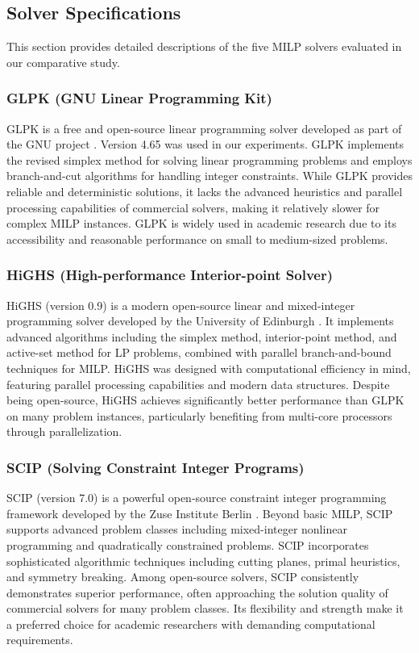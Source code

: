 \documentclass[11pt,a4paper]{article}
\begin{document}
\subsection{Solver Specifications}
This section provides detailed descriptions of the five MILP solvers evaluated in our comparative study.

\subsubsection{GLPK (GNU Linear Programming Kit)}
GLPK is a free and open-source linear programming solver developed as part of the GNU project \cite{glpk2024}. Version 4.65 was used in our experiments. GLPK implements the revised simplex method for solving linear programming problems and employs branch-and-cut algorithms for handling integer constraints. While GLPK provides reliable and deterministic solutions, it lacks the advanced heuristics and parallel processing capabilities of commercial solvers, making it relatively slower for complex MILP instances. GLPK is widely used in academic research due to its accessibility and reasonable performance on small to medium-sized problems.

\subsubsection{HiGHS (High-performance Interior-point Solver)}
HiGHS (version 0.9) is a modern open-source linear and mixed-integer programming solver developed by the University of Edinburgh \cite{highs2023}. It implements advanced algorithms including the simplex method, interior-point method, and active-set method for LP problems, combined with parallel branch-and-bound techniques for MILP. HiGHS was designed with computational efficiency in mind, featuring parallel processing capabilities and modern data structures. Despite being open-source, HiGHS achieves significantly better performance than GLPK on many problem instances, particularly benefiting from multi-core processors through parallelization.

\subsubsection{SCIP (Solving Constraint Integer Programs)}
SCIP (version 7.0) is a powerful open-source constraint integer programming framework developed by the Zuse Institute Berlin \cite{scip2023}. Beyond basic MILP, SCIP supports advanced problem classes including mixed-integer nonlinear programming and quadratically constrained problems. SCIP incorporates sophisticated algorithmic techniques including cutting planes, primal heuristics, and symmetry breaking. Among open-source solvers, SCIP consistently demonstrates superior performance, often approaching the solution quality of commercial solvers for many problem classes. Its flexibility and strength make it a preferred choice for academic researchers with demanding computational requirements.
\end{document}
